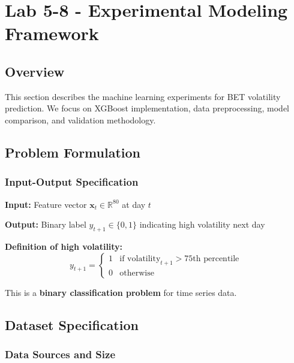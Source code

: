\documentclass[12pt,a4paper]{article}
\begin{document}
\newpage
\section{Lab 5-8 - Experimental Modeling Framework}

\subsection{Overview}

This section describes the machine learning experiments for BET volatility prediction. We focus on XGBoost implementation, data preprocessing, model comparison, and validation methodology.

\subsection{Problem Formulation}

\subsubsection{Input-Output Specification}

\textbf{Input:} Feature vector $\mathbf{x}_t \in \mathbb{R}^{80}$ at day $t$

\textbf{Output:} Binary label $y_{t+1} \in \{0, 1\}$ indicating high volatility next day

\textbf{Definition of high volatility:}
\begin{equation}
y_{t+1} = \begin{cases}
1 & \text{if volatility}_{t+1} > \text{75th percentile} \\
0 & \text{otherwise}
\end{cases}
\end{equation}

This is a \textbf{binary classification problem} for time series data.

\subsection{Dataset Specification}

\subsubsection{Data Sources and Size}
\end{document}
